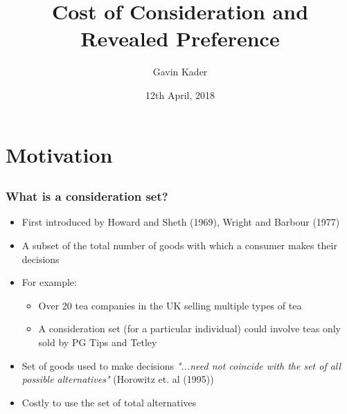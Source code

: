 \documentclass[xcolor=table]{beamer}
\title[CC \& RP]{\textbf{Cost of Consideration and Revealed Preference}}
\author
{Gavin Kader}
\institute{UCL}
\date[12th April, 2018]{12th April, 2018}
\begin{document}
\begin{frame}
\titlepage
{}
\end{frame}

\section{Motivation}
\subsection{}
\begin{frame}
\frametitle{What is a consideration set?}
\begin{itemize}
\pause
\item  First introduced by Howard and Sheth (1969), Wright and Barbour (1977)
\item A subset of the total number of goods with which a consumer makes their decisions
\item For example:
	\begin{itemize}
	\item Over 20 tea companies in the UK selling multiple types of tea
	\item A consideration set (for a particular individual) could involve teas only sold by PG Tips and Tetley
	\end{itemize}
\pause
\item Set of goods used to make decisions \textit{"...need not coincide with the set of all possible alternatives"} (Horowitz et. al (1995))
\item Costly to use the set of total alternatives
\end{itemize}
\end{frame}
\end{document}
